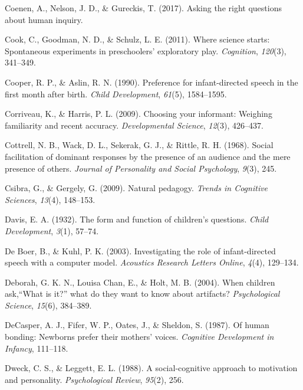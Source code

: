 \documentclass[english,floatsintext,man]{apa6}
\theoremstyle{definition}
\theoremstyle{definition}
\theoremstyle{definition}
\theoremstyle{remark}
\begin{document}
\hypertarget{ref-coenen2017asking}{}
Coenen, A., Nelson, J. D., \& Gureckis, T. (2017). Asking the right
questions about human inquiry.

\hypertarget{ref-cook2011science}{}
Cook, C., Goodman, N. D., \& Schulz, L. E. (2011). Where science starts:
Spontaneous experiments in preschoolers' exploratory play.
\emph{Cognition}, \emph{120}(3), 341--349.

\hypertarget{ref-cooper1990preference}{}
Cooper, R. P., \& Aslin, R. N. (1990). Preference for infant-directed
speech in the first month after birth. \emph{Child Development},
\emph{61}(5), 1584--1595.

\hypertarget{ref-corriveau2009choosing}{}
Corriveau, K., \& Harris, P. L. (2009). Choosing your informant:
Weighing familiarity and recent accuracy. \emph{Developmental Science},
\emph{12}(3), 426--437.

\hypertarget{ref-cottrell1968social}{}
Cottrell, N. B., Wack, D. L., Sekerak, G. J., \& Rittle, R. H. (1968).
Social facilitation of dominant responses by the presence of an audience
and the mere presence of others. \emph{Journal of Personality and Social
Psychology}, \emph{9}(3), 245.

\hypertarget{ref-csibra2009natural}{}
Csibra, G., \& Gergely, G. (2009). Natural pedagogy. \emph{Trends in
Cognitive Sciences}, \emph{13}(4), 148--153.

\hypertarget{ref-davis1932form}{}
Davis, E. A. (1932). The form and function of children's questions.
\emph{Child Development}, \emph{3}(1), 57--74.

\hypertarget{ref-de2003investigating}{}
De Boer, B., \& Kuhl, P. K. (2003). Investigating the role of
infant-directed speech with a computer model. \emph{Acoustics Research
Letters Online}, \emph{4}(4), 129--134.

\hypertarget{ref-deborah2004children}{}
Deborah, G. K. N., Louisa Chan, E., \& Holt, M. B. (2004). When children
ask,``What is it?'' what do they want to know about artifacts?
\emph{Psychological Science}, \emph{15}(6), 384--389.

\hypertarget{ref-decasper1987human}{}
DeCasper, A. J., Fifer, W. P., Oates, J., \& Sheldon, S. (1987). Of
human bonding: Newborns prefer their mothers' voices. \emph{Cognitive
Development in Infancy}, 111--118.

\hypertarget{ref-dweck1988social}{}
Dweck, C. S., \& Leggett, E. L. (1988). A social-cognitive approach to
motivation and personality. \emph{Psychological Review}, \emph{95}(2),
256.
\end{document}
